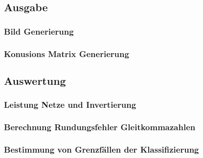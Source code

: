 \documentclass[Interploate_hadwritten_Digits.tex]{subfiles}
\begin{document}
	\subsection{Ausgabe}
	\subsubsection{Bild Generierung}
	
	\subsubsection{Konusions Matrix Generierung}
	
	
	\subsection{Auswertung}
	\subsubsection{Leistung Netze und Invertierung}
	
	\subsubsection{Berechnung Rundungsfehler Gleitkommazahlen}
	
	\subsubsection{Bestimmung von Grenzfällen der Klassifizierung}
	
\end{document}
